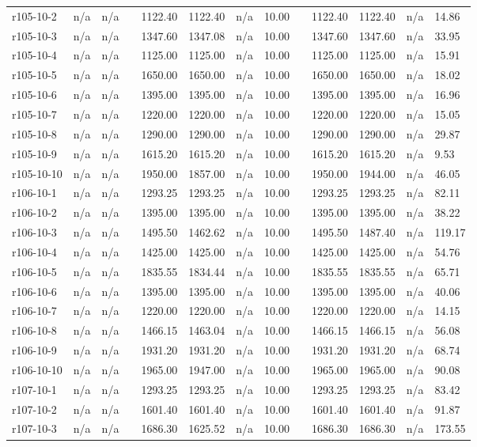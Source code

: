 \documentclass[final,5p,times,twocolumn]{elsarticle}
\begin{document}
{{{{{{{{{{{{{\begin{longtable}{l l l l l l l l l l l l l}
r105-10-2& n/a& n/a&&1122.40& 1122.40& n/a& 10.00&&1122.40& 1122.40& n/a& 14.86\\
r105-10-3& n/a& n/a&&1347.60& 1347.08& n/a& 10.00&&1347.60& 1347.60& n/a& 33.95\\
r105-10-4& n/a& n/a&&1125.00& 1125.00& n/a& 10.00&&1125.00& 1125.00& n/a& 15.91\\
r105-10-5& n/a& n/a&&1650.00& 1650.00& n/a& 10.00&&1650.00& 1650.00& n/a& 18.02\\
r105-10-6& n/a& n/a&&1395.00& 1395.00& n/a& 10.00&&1395.00& 1395.00& n/a& 16.96\\
r105-10-7& n/a& n/a&&1220.00& 1220.00& n/a& 10.00&&1220.00& 1220.00& n/a& 15.05\\
r105-10-8& n/a& n/a&&1290.00& 1290.00& n/a& 10.00&&1290.00& 1290.00& n/a& 29.87\\
r105-10-9& n/a& n/a&&1615.20& 1615.20& n/a& 10.00&&1615.20& 1615.20& n/a& 9.53\\
r105-10-10& n/a& n/a&&1950.00& 1857.00& n/a& 10.00&&1950.00& 1944.00& n/a& 46.05\\
r106-10-1& n/a& n/a&&1293.25& 1293.25& n/a& 10.00&&1293.25& 1293.25& n/a& 82.11\\
r106-10-2& n/a& n/a&&1395.00& 1395.00& n/a& 10.00&&1395.00& 1395.00& n/a& 38.22\\
r106-10-3& n/a& n/a&&1495.50& 1462.62& n/a& 10.00&&1495.50& 1487.40& n/a& 119.17\\
r106-10-4& n/a& n/a&&1425.00& 1425.00& n/a& 10.00&&1425.00& 1425.00& n/a& 54.76\\
r106-10-5& n/a& n/a&&1835.55& 1834.44& n/a& 10.00&&1835.55& 1835.55& n/a& 65.71\\
r106-10-6& n/a& n/a&&1395.00& 1395.00& n/a& 10.00&&1395.00& 1395.00& n/a& 40.06\\
r106-10-7& n/a& n/a&&1220.00& 1220.00& n/a& 10.00&&1220.00& 1220.00& n/a& 14.15\\
r106-10-8& n/a& n/a&&1466.15& 1463.04& n/a& 10.00&&1466.15& 1466.15& n/a& 56.08\\
r106-10-9& n/a& n/a&&1931.20& 1931.20& n/a& 10.00&&1931.20& 1931.20& n/a& 68.74\\
r106-10-10& n/a& n/a&&1965.00& 1947.00& n/a& 10.00&&1965.00& 1965.00& n/a& 90.08\\
r107-10-1& n/a& n/a&&1293.25& 1293.25& n/a& 10.00&&1293.25& 1293.25& n/a& 83.42\\
r107-10-2& n/a& n/a&&1601.40& 1601.40& n/a& 10.00&&1601.40& 1601.40& n/a& 91.87\\
r107-10-3& n/a& n/a&&1686.30& 1625.52& n/a& 10.00&&1686.30& 1686.30& n/a& 173.55\\

\end{longtable}}}}}}}}}}}}}}
\end{document}
